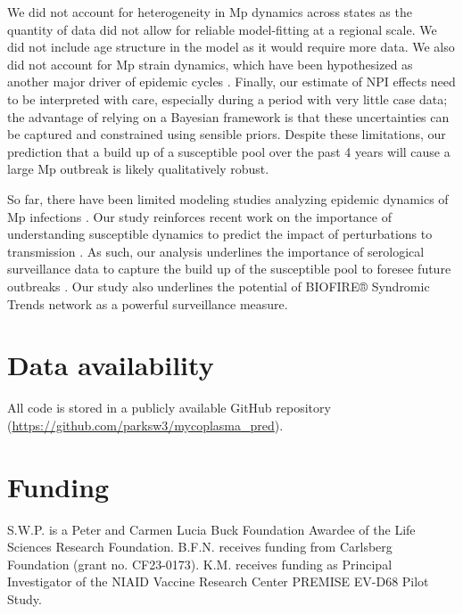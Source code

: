 \documentclass[12pt]{article}
\newcommand{\comment}[3]{\textcolor{#1}{\textbf{[#2: }\textsl{#3}\textbf{]}}}
\newcommand{\swp}[1]{\comment{magenta}{SWP}{#1}}
\begin{document}
We did not account for heterogeneity in Mp dynamics across states as the quantity of data did not allow for reliable model-fitting at a regional scale.
We did not include age structure in the model as it would require more data.
We also did not account for Mp strain dynamics, which have been hypothesized as another major driver of epidemic cycles \citep{kenri2008genotyping,zhang2019positively}.
Finally, our estimate of NPI effects need to be interpreted with care, especially during a period with very little case data;
the advantage of relying on a Bayesian framework is that these uncertainties can be captured and constrained using sensible priors.
Despite these limitations, our prediction that a build up of a susceptible pool over the past 4 years will cause a large Mp outbreak is likely qualitatively robust.

So far, there have been limited modeling studies analyzing epidemic dynamics of Mp infections \citep{omori2015determinant,zhang2019positively}. 
Our study reinforces recent work on the importance of understanding susceptible dynamics to predict the impact of perturbations to transmission \citep{baker2020impact,park2024predicting}.
As such, our analysis underlines the importance of serological surveillance data to capture the build up of the susceptible pool to foresee future outbreaks \citep{mina2020global,nguyen2022enterovirus}.
Our study also underlines the potential of BIOFIRE® Syndromic Trends network as a powerful surveillance measure.

\section*{Data availability}

All code is stored in a publicly available GitHub repository (\url{https://github.com/parksw3/mycoplasma_pred}).

\section*{Funding}

S.W.P. is a Peter and Carmen Lucia Buck Foundation Awardee of the Life Sciences Research Foundation.
B.F.N. receives funding from Carlsberg Foundation (grant no. CF23-0173).
K.M. receives funding as Principal Investigator of the NIAID Vaccine Research Center PREMISE EV-D68 Pilot Study.
\end{document}
